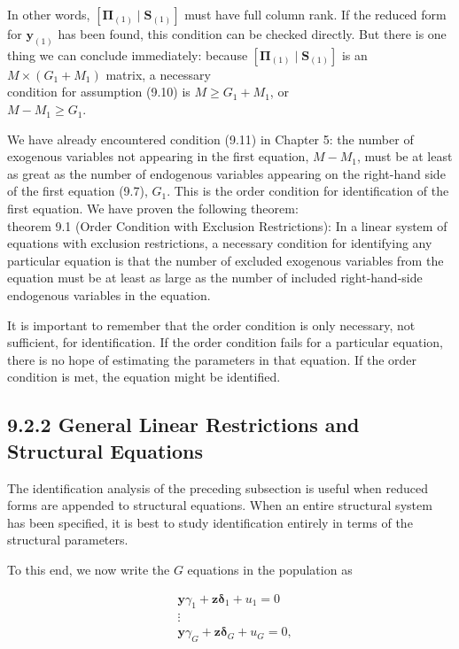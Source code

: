 \documentclass[10pt]{article}
\begin{document}
In other words, $\left[\boldsymbol{\Pi}_{(1)} \mid \mathbf{S}_{(1)}\right]$ must have full column rank. If the reduced form for $\mathbf{y}_{(1)}$ has been found, this condition can be checked directly. But there is one thing we can conclude immediately: because $\left[\boldsymbol{\Pi}_{(1)} \mid \mathbf{S}_{(1)}\right]$ is an $M \times\left(G_{1}+M_{1}\right)$ matrix, a necessary\\
condition for assumption (9.10) is $M \geq G_{1}+M_{1}$, or\\
$M-M_{1} \geq G_{1}$.

We have already encountered condition (9.11) in Chapter 5: the number of exogenous variables not appearing in the first equation, $M-M_{1}$, must be at least as great as the number of endogenous variables appearing on the right-hand side of the first equation (9.7), $G_{1}$. This is the order condition for identification of the first equation. We have proven the following theorem:\\
theorem 9.1 (Order Condition with Exclusion Restrictions): In a linear system of equations with exclusion restrictions, a necessary condition for identifying any particular equation is that the number of excluded exogenous variables from the equation must be at least as large as the number of included right-hand-side endogenous variables in the equation.

It is important to remember that the order condition is only necessary, not sufficient, for identification. If the order condition fails for a particular equation, there is no hope of estimating the parameters in that equation. If the order condition is met, the equation might be identified.

\subsection*{9.2.2 General Linear Restrictions and Structural Equations}
The identification analysis of the preceding subsection is useful when reduced forms are appended to structural equations. When an entire structural system has been specified, it is best to study identification entirely in terms of the structural parameters.

To this end, we now write the $G$ equations in the population as


\begin{align*}
& \mathbf{y} \gamma_{1}+\mathbf{z} \boldsymbol{\delta}_{1}+u_{1}=0 \\
& \vdots  \tag{9.12}\\
& \mathbf{y} \gamma_{G}+\mathbf{z} \boldsymbol{\delta}_{G}+u_{G}=0,
\end{align*}
\end{document}
